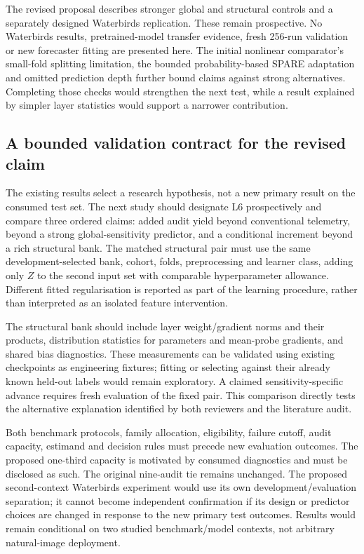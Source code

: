 \documentclass[nolineno]{ieeeaccess}
\begin{document}
The revised proposal describes stronger global and structural controls and a separately designed Waterbirds replication. These remain prospective. No Waterbirds results, pretrained-model transfer evidence, fresh 256-run validation or new forecaster fitting are presented here. The initial nonlinear comparator's small-fold splitting limitation, the bounded probability-based SPARE adaptation and omitted prediction depth further bound claims against strong alternatives. Completing those checks would strengthen the next test, while a result explained by simpler layer statistics would support a narrower contribution.


\subsection{A bounded validation contract for the revised claim}
The existing results select a research hypothesis, not a new primary result on the consumed test set. The next study should designate L6 prospectively and compare three ordered claims: added audit yield beyond conventional telemetry, beyond a strong global-sensitivity predictor, and a conditional increment beyond a rich structural bank. The matched structural pair must use the same development-selected bank, cohort, folds, preprocessing and learner class, adding only $Z$ to the second input set with comparable hyperparameter allowance. Different fitted regularisation is reported as part of the learning procedure, rather than interpreted as an isolated feature intervention.

The structural bank should include layer weight/gradient norms and their products, distribution statistics for parameters and mean-probe gradients, and shared bias diagnostics. These measurements can be validated using existing checkpoints as engineering fixtures; fitting or selecting against their already known held-out labels would remain exploratory. A claimed sensitivity-specific advance requires fresh evaluation of the fixed pair. This comparison directly tests the alternative explanation identified by both reviewers and the literature audit.

Both benchmark protocols, family allocation, eligibility, failure cutoff, audit capacity, estimand and decision rules must precede new evaluation outcomes. The proposed one-third capacity is motivated by consumed diagnostics and must be disclosed as such. The original nine-audit tie remains unchanged. The proposed second-context Waterbirds experiment would use its own development/evaluation separation; it cannot become independent confirmation if its design or predictor choices are changed in response to the new primary test outcomes. Results would remain conditional on two studied benchmark/model contexts, not arbitrary natural-image deployment.
\end{document}
